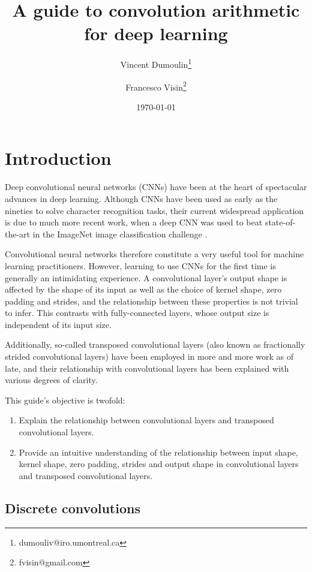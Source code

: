 \documentclass{report}
\title{A guide to convolution arithmetic for deep learning}
\author[*]{Vincent Dumoulin\thanks{dumouliv@iro.umontreal.ca}}
\author[*]{Francesco Visin\thanks{fvisin@gmail.com}}
\affil[*]{MILA, Universit\'{e} de Montr\'{e}al}
\date{\today}
\begin{document}
\maketitle

\chapter{Introduction}

Deep convolutional neural networks (CNNs) have been at the heart of spectacular
advances in deep learning. Although CNNs have been used as early as the nineties
\citep{lecun1998gradient} to solve character recognition tasks, their current
widespread application is due to much more recent work, when a deep CNN was used
to beat state-of-the-art in the ImageNet image classification challenge
\citep{krizhevsky2012imagenet}.

Convolutional neural networks therefore constitute a very useful tool for
machine learning practitioners. However, learning to use CNNs for the first time
is generally an intimidating experience. A convolutional layer's output shape is
affected by the shape of its input as well as the choice of kernel shape, zero
padding and strides, and the relationship between these properties is not
trivial to infer. This contrasts with fully-connected layers, whose output size
is independent of its input size.

Additionally, so-called transposed convolutional layers (also known as
fractionally strided convolutional layers) have been employed in more and more
work as of late, and their relationship with convolutional layers has been
explained with various degrees of clarity.

This guide's objective is twofold:

\begin{enumerate}
    \item Explain the relationship between convolutional layers and transposed
        convolutional layers.
    \item Provide an intuitive understanding of the relationship between input
        shape, kernel shape, zero padding, strides and output shape in
        convolutional layers and transposed convolutional layers.
\end{enumerate}

\section{Discrete convolutions}
\end{document}
